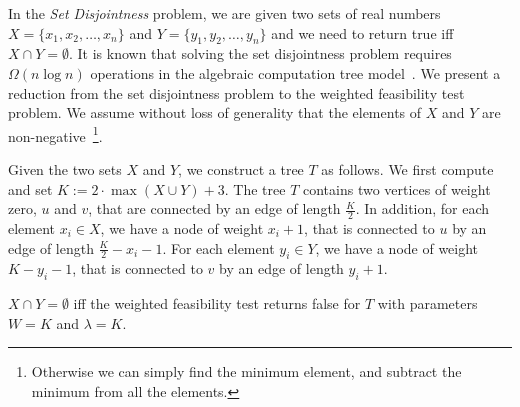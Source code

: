 \documentclass[a4paper,UKenglish]{lipics-v2016}
\theoremstyle{plain}
\begin{document}
In the {\em Set Disjointness} problem, we are given two sets of real numbers $X=\lbrace x_1,x_2,\ldots,x_n \rbrace$ and $Y=\lbrace y_1,y_2,\ldots,y_n \rbrace$ and we need to return true iff $X \cap Y = \emptyset$. 
It is known that solving the set disjointness problem requires $\Omega(n \log n)$ operations in the algebraic
computation tree model~\cite{BenOr}.
We present a reduction from the set disjointness problem to the weighted feasibility test problem. We assume without loss of generality that the elements of $X$ and $Y$ are non-negative~\footnote{Otherwise
we can simply find the minimum element, and subtract the minimum from all the elements.}.


Given the two sets $X$ and $Y$, we construct a tree $T$ as follows. We first compute and set
$K := 2 \cdot \max (X\cup Y) +3$.
The tree $T$ contains two vertices of weight zero, $u$ and $v$, that are connected by an edge of length $\frac{K}{2}$. In addition, for each element $x_i \in X$, we have a node of weight $x_i+1$, that is connected to $u$ by an edge of length $\frac{K}{2} - x_i -1$. For each element $y_i \in Y$, we have a node of weight $K - y_i -1$, that is connected to $v$ by an edge of length $y_i+1$.
\begin{lemma}\label{lemma of the reduction to set disjointness}
$X \cap Y = \emptyset$ iff the weighted feasibility test returns false for $T$ with  parameters $W=K$ and $\lambda =K$.
\end{lemma}
\end{document}
